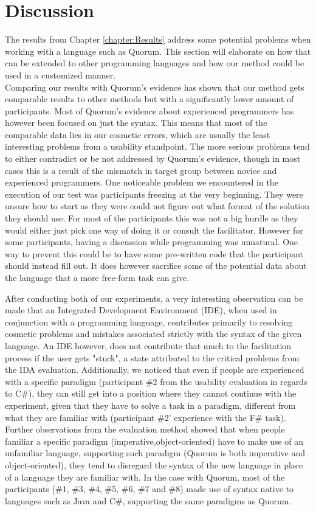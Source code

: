 \chapter{Discussion}
The results from Chapter \ref{chapter:Results} address some potential problems when working with a language such as Quorum. This section will elaborate on how that can be extended to other programming languages and how our method could be used in a customized manner.
\\

Comparing our results with Quorum's evidence has shown that our method gets comparable results to other methods but with a significantly lower amount of participants.
Most of Quorum's evidence about experienced programmers has however been focused on just the syntax.
This means that most of the comparable data lies in our cosmetic errors, which are usually the least interesting problems from a usability standpoint.
The more serious problems tend to either contradict or be not addressed by Quorum's evidence, though in most cases this is a result of the mismatch in target group between novice and experienced programmers.
One noticeable problem we encountered in the execution of our test was participants freezing at the very beginning.
They were unsure how to start as they were could not figure out what format of the solution they should use.
For most of the participants this was not a big hurdle as they would either just pick one way of doing it or consult the facilitator.
However for some participants, having a discussion while programming was unnatural.
One way to prevent this could be to have some pre-written code that the participant should instead fill out.
It does however sacrifice some of the potential data about the language that a more free-form task can give.

After conducting both of our experiments, a very interesting observation can be made that an Integrated Development Environment (IDE), when used in conjunction with a programming language, contributes primarily to resolving cosmetic problems and mistakes associated strictly with the syntax of the given language. An IDE however, does not contribute that much to the facilitation process if the user gets "stuck", a state attributed to the critical problems from the IDA evaluation. Additionally, we noticed that even if people are experienced with a specific paradigm (participant \#2 from the usability evaluation in regards to C\#), they can still get into a position where they cannot continue with the experiment, given that they have to solve a task in a paradigm, different from what they are familiar with (participant \#2' experience with the F\# task). Further observations from the evaluation method showed that when people familiar a specific paradigm (imperative,object-oriented) have to make use of an unfamiliar language, supporting such paradigm (Quorum is both imperative and object-oriented), they tend to disregard the syntax of the new language in place of a language they are familiar with. In the case with Quorum, most of the participants (\#1, \#3, \#4, \#5, \#6, \#7 and \#8) made use of syntax native to languages such as Java and C\#, supporting the same paradigms as Quorum.

